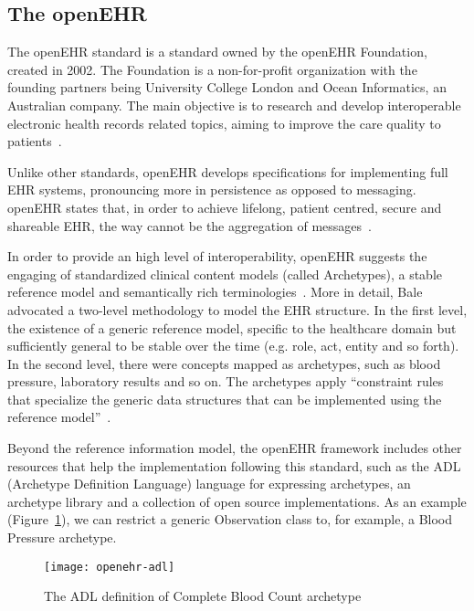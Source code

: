 \subsection{The openEHR} \label{sec:openehr}

The openEHR standard is a standard owned by the openEHR Foundation, created in 2002. The Foundation is a non-for-profit organization with the founding partners being University College London and Ocean Informatics, an Australian company. The main objective is to research and develop interoperable electronic health records related topics, aiming to improve the care quality to patients~\citep{Leslie2007}.

Unlike other standards, openEHR develops specifications for implementing full EHR systems, pronouncing more in persistence as opposed to messaging. openEHR states that, in order to achieve lifelong, patient centred, secure and shareable EHR, the way cannot be the aggregation of messages~\citep{Beale2002}.

In order to provide an high level of interoperability, openEHR suggests the engaging of standardized clinical content models (called Archetypes), a stable reference model and semantically rich terminologies~\citep{Atalag2010}. More in detail, Bale advocated a two-level methodology to model the EHR structure. In the first level, the existence of a generic reference model, specific to the healthcare domain but sufficiently general to be stable over the time (e.g. role, act, entity and so forth). In the second level, there were concepts mapped as archetypes, such as blood pressure, laboratory results and so on. The archetypes apply ``constraint rules  that specialize the generic data structures that can be implemented using the reference model''~\citep{Beale2002}.

Beyond the reference information model, the openEHR framework includes other resources that help the implementation following this standard, such as the ADL (Archetype Definition Language) language for expressing archetypes, an archetype library and a collection of open source implementations. As an example (Figure~\ref{fig:openehr-adl}), we can restrict a generic Observation class to, for example, a Blood Pressure archetype.

\begin{figure}[t]
\centering
\texttt{[image: openehr-adl]}
\caption[The ADL definition of Complete Blood Count archetype]{The ADL definition of Complete Blood Count archetype ~\citep{Eichelberg2005}}
\label{fig:openehr-adl}
\end{figure}



